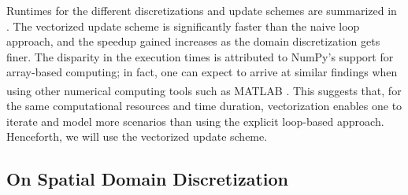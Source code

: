 \documentclass{article}
\begin{document}
Runtimes for the different discretizations and update schemes are summarized in .
The vectorized update scheme is significantly faster than the naive loop approach,
and the speedup gained increases as the domain discretization gets finer.
The disparity in the execution times is attributed to NumPy's support for array-based computing;
in fact, one can expect to arrive at similar findings when using other numerical computing tools such as
MATLAB\textsuperscript{\textregistered} \citep{MATLABR2020b}.
This suggests that, for the same computational resources and time duration,
vectorization enables one to iterate and model more scenarios
than using the explicit loop-based approach.
Henceforth, we will use the vectorized update scheme.

\subsection{On Spatial Domain Discretization}
\label{subsec: On Spatial Domain Discretization}
\end{document}
